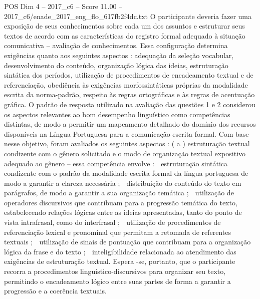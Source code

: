 \begin{textsample}{POS Dim 4 – 2017\_c6 – Score 11.00 – 2017\_c6/enade\_2017\_eng\_flo\_617fb2f4dc.txt}
O participante deveria fazer uma exposição de seus conhecimentos sobre cada um dos assuntos e estruturar seus textos de acordo com as características do registro formal adequado à situação comunicativa – avaliação de conhecimentos.
Essa configuração determina exigências quanto aos seguintes aspectos : adequação da seleção vocabular, desenvolvimento do conteúdo, organização lógica das ideias, estruturação sintática dos períodos, utilização de procedimentos de encadeamento textual e de referenciação, obediência às exigências morfossintáticas próprias da modalidade escrita da norma-padrão, respeito às regras ortográficas e às regras de acentuação gráfica.
O padrão de resposta utilizado na avaliação das questões 1 e 2 considerou os aspectos relevantes ao bom desempenho linguístico como competências distintas, de modo a permitir um mapeamento detalhado do domínio dos recursos disponíveis na Língua Portuguesa para a comunicação escrita formal.
Com base nesse objetivo, foram avaliados os seguintes aspectos : ( a ) estruturação textual condizente com o gênero solicitado e o modo de organização textual expositivo adequado ao gênero – essa competência envolve :  estruturação sintática condizente com o padrão da modalidade escrita formal da língua portuguesa de modo a garantir a clareza necessária ;  distribuição do conteúdo do texto em parágrafos, de modo a garantir a sua organização temática ;  utilização de operadores discursivos que contribuam para a progressão temática do texto, estabelecendo relações lógicas entre as ideias apresentadas, tanto do ponto de vista intrafrasal, como do interfrasal ;  utilização de procedimentos de referenciação lexical e pronominal que permitam a retomada de referentes textuais ;  utilização de sinais de pontuação que contribuam para a organização lógica da frase e do texto ;  inteligibilidade relacionada ao atendimento das exigências de estruturação textual.
Espera -se, portanto, que o participante recorra a procedimentos linguístico-discursivos para organizar seu texto, permitindo o encadeamento lógico entre suas partes de forma a garantir a progressão e a coerência textuais.

\end{textsample}
